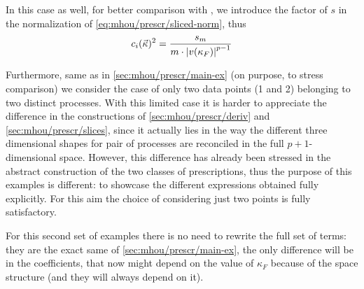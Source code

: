 In this case as well, for better comparison with \cite{NNPDF:2019ubu}, we
introduce the factor of $s$ in the normalization of \cref{eq:mhou/prescr/sliced-norm}, thus
\begin{equation}
    c_i(\vec{\kappa})^2 = \frac{s_m}{m \cdot \abs{v(\kappa_F)}^{p-1}}
\end{equation}

Furthermore, same as in \cref{sec:mhou/prescr/main-ex} (on purpose, to stress comparison)
we consider the case of only two data points (1 and 2) belonging to two
distinct processes.
With this limited case it is harder to appreciate the difference in the
constructions of \cref{sec:mhou/prescr/deriv} and \cref{sec:mhou/prescr/slices}, since it actually lies
in the way the different three dimensional shapes for pair of processes are
reconciled in the full $p+1$-dimensional space.
However, this difference has already been stressed in the abstract construction
of the two classes of prescriptions, thus the purpose of this examples is
different: to showcase the different expressions obtained fully explicitly.
For this aim the choice of considering just two points is fully satisfactory.

For this second set of examples there is no need to rewrite the full set of
terms: they are the exact same of \cref{sec:mhou/prescr/main-ex}, the only difference will
be in the coefficients, that now might depend on the value of $\kappa_F$
because of the space structure (and they will always depend on it).

